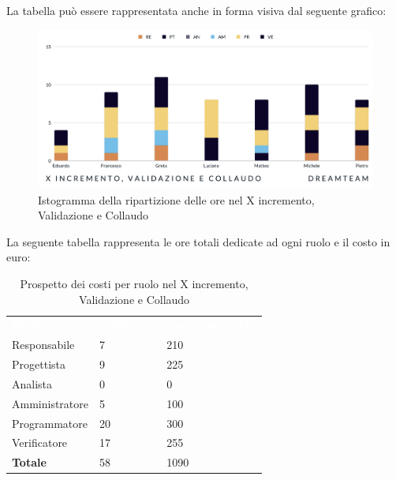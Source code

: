 La tabella può essere rappresentata anche in forma visiva dal seguente grafico:
\begin{figure}[H]
\centering
\includegraphics[scale=0.50]{Sezioni/SezioniPreventivo/grafici/validazione/Validazione_X_incremento.png}
\caption{Istogramma della ripartizione delle ore nel X incremento, Validazione e Collaudo}
\end{figure}

La seguente tabella rappresenta le ore totali dedicate ad ogni ruolo e il costo in euro:

\begin{table}[H]
\begin{center}
\renewcommand{\arraystretch}{1.5}
\begin{tabular}{ m{}<{\centering}  m{}<{\centering} m{}<{\centering}}
	\rowcolor{darkblue}
	\textcolor{white}{\textbf{Ruolo}}&\textcolor{white}{\textbf{Totale ore}}&\textcolor{white}{\textbf{Costo totale (\euro)}}\\ 

	Responsabile  & 7 & 210 \\	
	
	Progettista & 9 & 225 \\
	
	Analista & 0 & 0 \\

	Amministratore & 5 & 100 \\
	
	Programmatore & 20 & 300 \\
	
	Verificatore & 17 & 255 \\
	
	\textbf{Totale} & 58 & 1090 \\
	
\end{tabular}
\caption{Prospetto dei costi per ruolo nel X incremento, Validazione e Collaudo}
\end{center}
\end{table}

